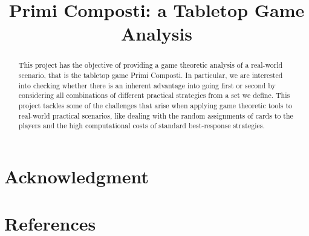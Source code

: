 \documentclass[conference]{IEEEtran}
\begin{document}
\title{Primi Composti: a Tabletop Game Analysis}

\author{
\and
{}
\and
{}
}
\maketitle

\begin{abstract}
	This project has the objective of providing a game theoretic analysis of a real-world scenario, that is the tabletop game Primi Composti. In particular, we are interested into checking whether there is an inherent advantage into going first or second by considering all combinations of different practical strategies from a set we define.
	This project tackles some of the challenges that arise when applying game theoretic tools to real-world practical scenarios, like dealing with the random assignments of cards to the players and the high computational costs of standard best-response strategies.
\end{abstract}







\section*{Acknowledgment}


\section*{References}
\end{document}
